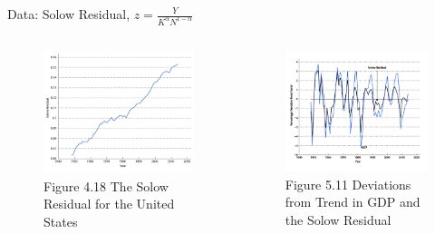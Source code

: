 \documentclass[11pt,aspectratio=43]{beamer}
\theoremstyle{definition}
\begin{document}
\begin{frame}{Data: Solow Residual, $ z = \frac{Y}{K^{\alpha} N^{1-\alpha}} $}
\label{slide:Data__Solow_Residual____z____frac_Y__K___alpha__N__1__alpha____}
    \begin{columns}
        \begin{column}{0.5\textwidth}
            \begin{figure}
                \caption{\scriptsize Figure 4.18  The Solow Residual for the United States}
                \includegraphics[width=\textwidth]{./figures/Figure4_18.jpg}
            \end{figure}
        \end{column}
        \begin{column}{0.5\textwidth}
            \begin{figure}
                \caption{\scriptsize Figure 5.11  Deviations from Trend in GDP and the Solow Residual}
                \includegraphics[width=\textwidth]{./figures/Figure5_11.jpg}
            \end{figure}
        \end{column}
    \end{columns}
\end{frame}
\end{document}
